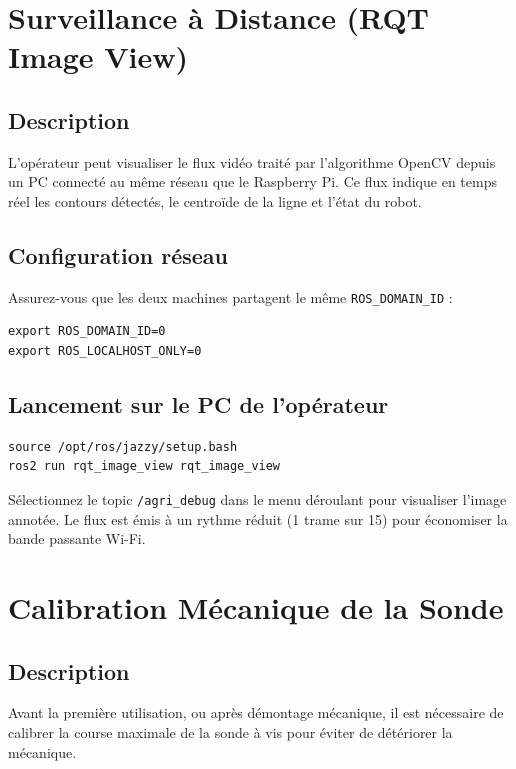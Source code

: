 \documentclass [12pt, a4paper]{article}
\begin{document}
\section{Surveillance à Distance (RQT Image View)}

\subsection{Description}
L'opérateur peut visualiser le flux vidéo traité par l'algorithme OpenCV depuis un PC connecté au même réseau que le Raspberry Pi. Ce flux indique en temps réel les contours détectés, le centroïde de la ligne et l'état du robot.

\subsection{Configuration réseau}
Assurez-vous que les deux machines partagent le même \texttt{ROS\_DOMAIN\_ID} :
\begin{verbatim}
export ROS_DOMAIN_ID=0
export ROS_LOCALHOST_ONLY=0
\end{verbatim}

\subsection{Lancement sur le PC de l'opérateur}
\begin{verbatim}
source /opt/ros/jazzy/setup.bash
ros2 run rqt_image_view rqt_image_view
\end{verbatim}
Sélectionnez le topic \texttt{/agri\_debug} dans le menu déroulant pour visualiser l'image annotée. Le flux est émis à un rythme réduit (1 trame sur 15) pour économiser la bande passante Wi-Fi.

\section{Calibration Mécanique de la Sonde}

\subsection{Description}
Avant la première utilisation, ou après démontage mécanique, il est nécessaire de calibrer la course maximale de la sonde à vis pour éviter de détériorer la mécanique.
\end{document}
